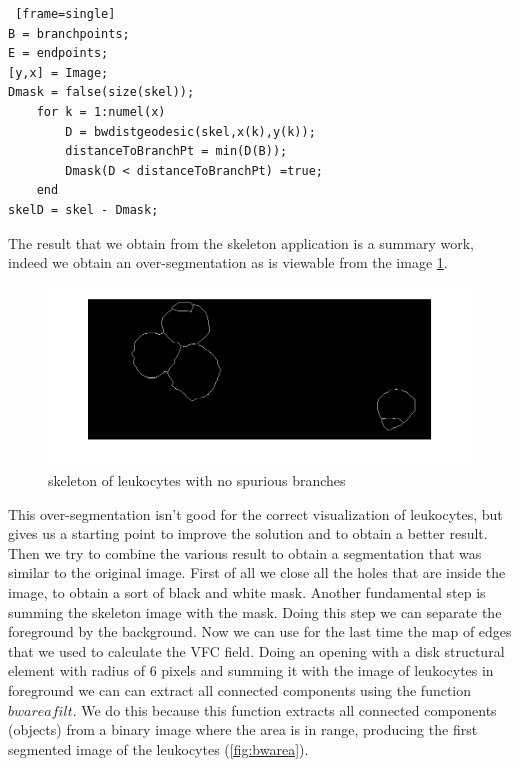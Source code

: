 \begin{minipage}{\linewidth}
\begin{scriptsize}
	\begin{lstlisting} [frame=single]
B = branchpoints;
E = endpoints;
[y,x] = Image;
Dmask = false(size(skel));
	for k = 1:numel(x)
    	D = bwdistgeodesic(skel,x(k),y(k));
    	distanceToBranchPt = min(D(B));
    	Dmask(D < distanceToBranchPt) =true;
	end
skelD = skel - Dmask;
	\end{lstlisting}
\end{scriptsize}
\end{minipage}
The result that we obtain from the skeleton application is a summary work, indeed we obtain an over-segmentation as is viewable from the image \ref{fig:skelfin}.
\begin{figure}
	\begin{center}
		\centering
		\includegraphics[scale=0.5]{img/skelfin.png}
		\caption{skeleton of leukocytes with no spurious branches}
		\label{fig:skelfin}
	\end{center}
\end{figure}
This over-segmentation isn't good for the correct visualization of leukocytes, but gives us a starting point to improve the solution and to obtain a better result.
Then we try to combine the various result to obtain a segmentation that was similar to the original image. First of all we close all the holes that are inside the image, to obtain a sort of black and white mask. Another fundamental step is summing the skeleton image with the mask. Doing this step we can separate the foreground by the background. Now we can use for the last time the map of edges that we used to calculate the VFC field. Doing an opening with a disk structural element with radius of 6 pixels and summing it with the image of leukocytes in foreground  we can can extract all connected components using the function $bwareafilt$. We do this because this function extracts all connected components (objects) from a binary image where the area is in range, producing the first segmented image of the leukocytes (\ref{fig:bwarea}).
